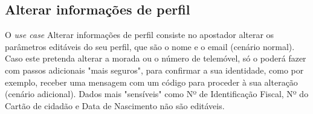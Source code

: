 \newpage
\subsection{Alterar informações de perfil}
O \textit{use case} Alterar informações de perfil consiste no apostador alterar os parâmetros editáveis do seu perfil, que são o nome e o email (cenário normal). Caso este pretenda alterar a morada ou o número de telemóvel, só o poderá fazer com passos adicionais "mais seguros", para confirmar a sua identidade, como por exemplo, receber uma mensagem com um código para proceder à sua alteração (cenário adicional). Dados mais "sensíveis" como Nº de Identificação Fiscal, Nº do Cartão de cidadão e Data de Nascimento não são editáveis.
\begin{table}[H]
\begin{center}
\end{center}
\end{table}

